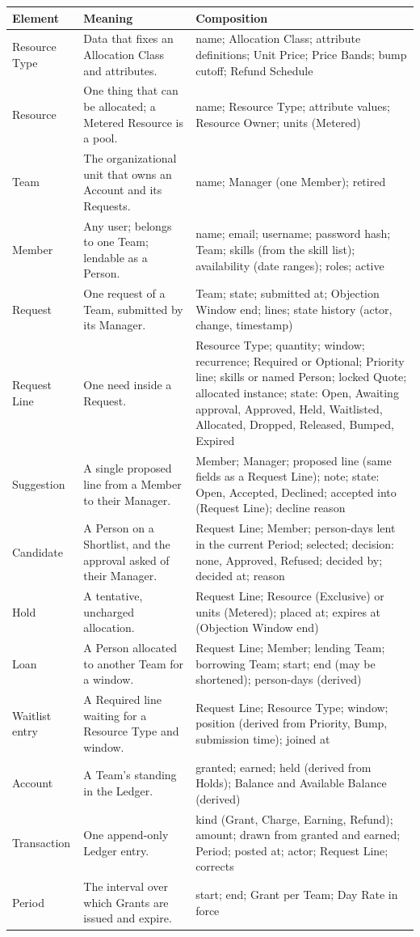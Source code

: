{\footnotesize
\begin{tabularx}{\textwidth}{@{}L{2.4cm}YL{6.2cm}@{}}
\toprule
\textbf{Element} & \textbf{Meaning} & \textbf{Composition} \\
\midrule
Resource Type & Data that fixes an Allocation Class and attributes. & name; Allocation Class; attribute definitions; Unit Price; Price Bands; bump cutoff; Refund Schedule \\
Resource & One thing that can be allocated; a Metered Resource is a pool. & name; Resource Type; attribute values; Resource Owner; units (Metered) \\
Team & The organizational unit that owns an Account and its Requests. & name; Manager (one Member); retired \\
Member & Any user; belongs to one Team; lendable as a Person. & name; email; username; password hash; Team; skills (from the skill list); availability (date ranges); roles; active \\
Request & One request of a Team, submitted by its Manager. & Team; state; submitted at; Objection Window end; lines; state history (actor, change, timestamp) \\
Request Line & One need inside a Request. & Resource Type; quantity; window; recurrence; Required or Optional; Priority line; skills or named Person; locked Quote; allocated instance; state: Open, Awaiting approval, Approved, Held, Waitlisted, Allocated, Dropped, Released, Bumped, Expired \\
Suggestion & A single proposed line from a Member to their Manager. & Member; Manager; proposed line (same fields as a Request Line); note; state: Open, Accepted, Declined; accepted into (Request Line); decline reason \\
Candidate & A Person on a Shortlist, and the approval asked of their Manager. & Request Line; Member; person-days lent in the current Period; selected; decision: none, Approved, Refused; decided by; decided at; reason \\
Hold & A tentative, uncharged allocation. & Request Line; Resource (Exclusive) or units (Metered); placed at; expires at (Objection Window end) \\
Loan & A Person allocated to another Team for a window. & Request Line; Member; lending Team; borrowing Team; start; end (may be shortened); person-days (derived) \\
Waitlist entry & A Required line waiting for a Resource Type and window. & Request Line; Resource Type; window; position (derived from Priority, Bump, submission time); joined at \\
Account & A Team's standing in the Ledger. & granted; earned; held (derived from Holds); Balance and Available Balance (derived) \\
Transaction & One append-only Ledger entry. & kind (Grant, Charge, Earning, Refund); amount; drawn from granted and earned; Period; posted at; actor; Request Line; corrects \\
Period & The interval over which Grants are issued and expire. & start; end; Grant per Team; Day Rate in force \\
\bottomrule
\end{tabularx}
}
